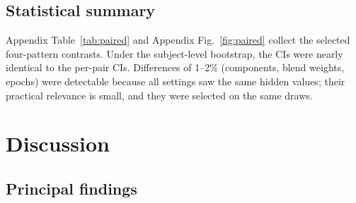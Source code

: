 \documentclass[11pt]{article}
\begin{document}
\begin{table}[t]
\centering\footnotesize
\caption{E4: downstream analyses on 220 complete BCP scans with real masks transplanted (50 replicates per
scenario). Trajectory: FA and MD tract means $\sim$ spline(log age) on the tracts without a planted effect, against the
complete-data fit; deviation: mean absolute difference from the complete-data curve (SD of the tract mean). Group effect:
planted in 5 tracts; Est.\,$-$\,full: mean difference from the complete-data estimate (between-scan SD); type I: rejections
in the tracts without a planted effect. ``Group 1 masked'': differential missingness, masks only in the group with the
planted effect.}\label{tab:e4}
\resizebox{\textwidth}{!}{}
\end{table}

\subsection{Statistical summary}

Appendix Table~\ref{tab:paired} and Appendix Fig.~\ref{fig:paired} collect the selected four-pattern contrasts. Under the subject-level
bootstrap, the CIs were nearly identical to the per-pair CIs. Differences of 1--2\% (components, blend weights, epochs)
were detectable because all settings saw the same hidden values; their practical relevance is small, and they were
selected on the same draws.

\section{Discussion}

\subsection{Principal findings}
\end{document}
